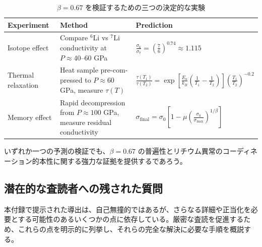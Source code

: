\documentclass[11pt,a4paper]{article}
\theoremstyle{remark}
\begin{document}
	\begin{table}[H]
		\begin{otherlanguage}{english}
			\centering
			\caption{Three decisive experiments to test \(\beta = 0.67\)}
			\label{tab:experiments}
			\begin{tabular}{p{}p{}p{}}
				\toprule
				\textbf{Experiment} & \textbf{Method} & \textbf{Prediction} \\
				\midrule
				Isotope effect & Compare \(^6\)Li vs \(^7\)Li conductivity at \(P \approx 40\)–60 GPa & \(\displaystyle \frac{\sigma_6}{\sigma_7} = \left(\frac{7}{6}\right)^{0.74} \approx 1.115\) \\
				\hline
				Thermal relaxation & Heat sample pre-compressed to \(P \approx 60\) GPa, measure \(\tau(T)\) & \(\displaystyle \frac{\tau(T_1)}{\tau(T_2)} = \exp\left[\frac{E_a}{k_B}\left(\frac1{T_1}-\frac1{T_2}\right)\right] \left(\frac{T_1}{T_2}\right)^{-0.2}\) \\
				\hline
				Memory effect & Rapid decompression from \(P \approx 100\) GPa, measure residual conductivity & \(\displaystyle \sigma_{\text{final}} = \sigma_0\left[1 - \mu\left(\frac{\sigma_0}{\sigma_{\max}}\right)^{1/\beta}\right]\) \\
				\bottomrule
			\end{tabular}
		\end{otherlanguage}
		\caption{\(\beta = 0.67\) を検証するための三つの決定的な実験}
	\end{table}
	
	いずれか一つの予測の検証でも、\(\beta = 0.67\) の普遍性とリチウム異常のコーディネーション的本性に関する強力な証拠を提供するであろう。
	
	\subsection{潜在的な査読者への残された質問}
	\label{subsec:remaining-questions}
	
	本付録で提示された導出は、自己無撞的ではあるが、さらなる詳細や正当化を必要とする可能性のあるいくつかの点に依存している。厳密な査読を促進するため、これらの点を明示的に列挙し、それらの完全な解決に必要な手順を概説する。
	
\end{document}
